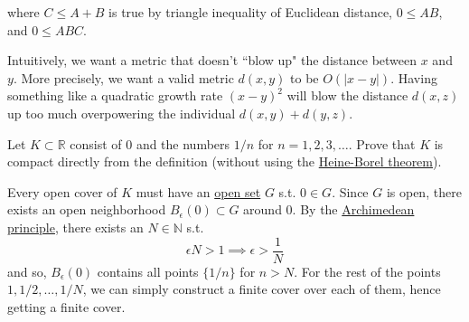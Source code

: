 \begin{solution}
\begin{enumerate}
        where $C \leq A + B$ is true by triangle inequality of Euclidean distance, $0 \leq AB$, and $0 \leq ABC$. 
    \end{enumerate}
    Intuitively, we want a metric that doesn't ``blow up" the distance between $x$ and $y$. More precisely, we want a valid metric $d(x, y)$ to be $O(|x - y|)$. Having something like a quadratic growth rate $(x - y)^2$ will blow the distance $d(x, z)$ up too much overpowering the individual $d(x, y) + d(y, z)$. 
  \end{solution}

  \begin{exercise}[Rudin 2.12]
    Let $K \subset \mathbb{R}$ consist of $0$ and the numbers $1/n$ for $n = 1, 2, 3, \ldots$. Prove that $K$ is compact directly from the definition (without using the \hyperref[pst-thm:heine-borel-theorem]{Heine-Borel theorem}). 
  \end{exercise}
  \begin{solution}
    Every open cover of $K$ must have an \hyperref[pst-def:open-set]{open set} $G$ s.t. $0 \in G$. Since $G$ is open, there exists an open neighborhood $B_\epsilon (0) \subset G$ around $0$. By the \hyperref[def:archimedean-principle]{Archimedean principle}, there exists an $N \in \mathbb{N}$ s.t. 
    \begin{equation}
      \epsilon N > 1 \implies \epsilon > \frac{1}{N}
    \end{equation}
    and so, $B_\epsilon (0)$ contains all points $\{1/n\}$ for $n > N$. For the rest of the points $1, 1/2, \ldots, 1/N$, we can simply construct a finite cover over each of them, hence getting a finite cover. 
  \end{solution}

